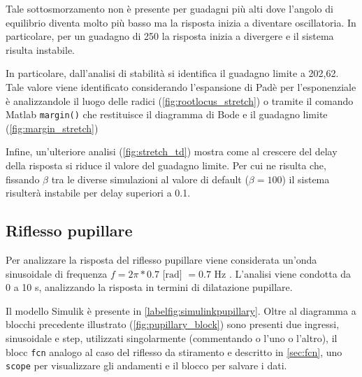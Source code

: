Tale sottosmorzamento non è presente per guadagni più alti dove l'angolo di equilibrio diventa molto più basso ma la risposta inizia a diventare oscillatoria. In particolare, per un guadagno di 250 la risposta inizia a divergere e il sistema risulta instabile. 

In particolare, dall'analisi di stabilità si identifica il guadagno limite a 202,62. Tale valore viene identificato considerando l'espansione di Padè per l'esponenziale è analizzandole il luogo delle radici (\cref{fig:rootlocus_stretch}) o tramite il comando Matlab \texttt{margin()} che restituisce il diagramma di Bode e il guadagno limite (\cref{fig:margin_stretch})

Infine, un'ulteriore analisi (\cref{fig:stretch_td}) mostra come al crescere del delay della risposta si riduce il valore del guadagno limite. Per cui ne risulta che, fissando $\beta$ tra le diverse simulazioni al valore di default ($\beta=100$) il sistema risulterà instabile per delay superiori a 0.1. 




\subsection{Riflesso pupillare}

Per analizzare la risposta del riflesso pupillare viene considerata un'onda sinusoidale di frequenza $f=2\pi *0.7 \text{ [rad] }= 0.7 \text{ Hz}$ \cite{stark_servoanalytic_1957}. 
L'analisi viene condotta da 0 a 10 s, analizzando la risposta in termini di dilatazione pupillare. 

Il modello Simulik è presente in \cref{labelfig:simulinkpupillary}. Oltre al diagramma a blocchi precedente illustrato (\cref{fig:pupillary_block}) sono presenti due ingressi, sinusoidale e step, utilizzati singolarmente (commentando o l'uno o l'altro), il blocc \texttt{fcn} analogo al caso del riflesso da stiramento e descritto in \cref{sec:fcn}, uno \texttt{scope} per visualizzare gli andamenti e il blocco per salvare i dati.




